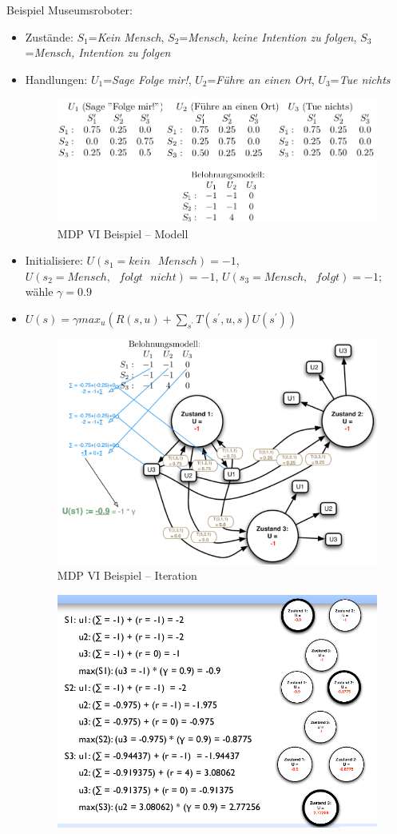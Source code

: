 Beispiel Museumsroboter:
\begin{itemize}
	\item Zustände: $S_1$=\textit{Kein Mensch}, $S_2$=\textit{Mensch, keine Intention zu folgen}, $S_3$=\textit{Mensch, Intention zu folgen} 
	\item Handlungen: $U_1$=\textit{Sage \glqq Folge mir!\grqq}, $U_2$=\textit{Führe an einen Ort}, $U_3$=\textit{Tue nichts}
	\begin{figure}[!h]
		\centering
  		\includegraphics[width=0.6\linewidth]{figures/ch07_vi-bsp.png}
		\caption{MDP VI Beispiel -- Modell}
		\label{fig:ch07:vi-bsp}
	\end{figure}
	\item Initialisiere: $U(s_1=kein\text{ }Mensch) = -1$, $U(s_2=Mensch,\text{ }folgt\text{ }nicht) = -1$, $U(s_3=Mensch,\text{ }folgt) = -1$; wähle $\gamma = 0.9$
	\item $U(s)=\gamma max_u(R(s,u)+\sum_{s^\prime}T(s^\prime,u,s)U(s^\prime))$
	\begin{figure}[!h]
		\centering
  		\includegraphics[width=0.45\linewidth]{figures/ch07_vi-bsp1.png}
		\caption{MDP VI Beispiel -- Iteration}
		\label{fig:ch07:vi-bsp1}
	\end{figure}
	\begin{figure}[!h]
		\centering
  		\includegraphics[width=0.65\linewidth]{figures/ch07_vi-bsp2.png}

\end{figure}
\end{itemize}
